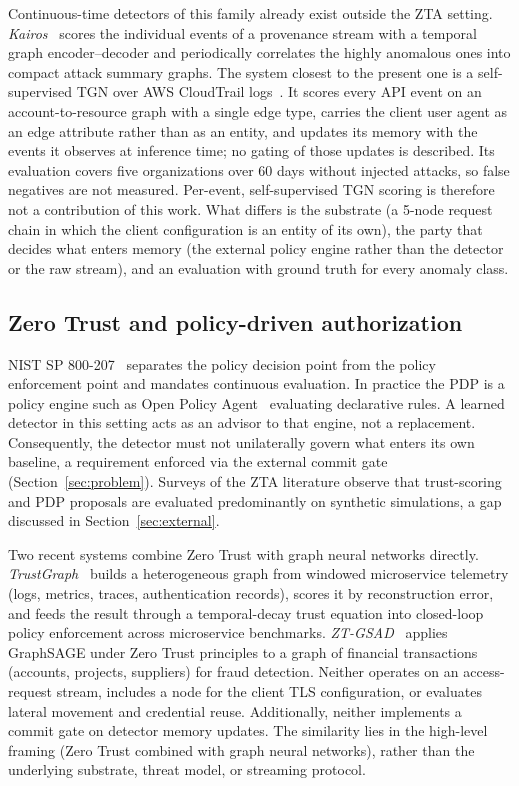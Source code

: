 Continuous-time detectors of this family already exist outside the ZTA setting.
\textit{Kairos}~\cite{kairos} scores the individual events of a provenance stream with a
temporal graph encoder--decoder and periodically correlates the highly anomalous ones into
compact attack summary graphs. The system
closest to the present one is a self-supervised TGN over AWS CloudTrail logs~\cite{cloudtrailtgn}.
It scores every API event on an account-to-resource graph with a single edge type, carries the
client user agent as an edge attribute rather than as an entity, and updates its memory with
the events it observes at inference time; no gating of those updates is described. Its
evaluation covers five organizations over 60 days without injected attacks, so false negatives
are not measured. Per-event, self-supervised TGN scoring is therefore not a contribution of this
work. What differs is the substrate (a 5-node request chain in which the client configuration
is an entity of its own), the party that decides what enters memory (the external policy
engine rather than the detector or the raw stream), and an evaluation with ground truth for
every anomaly class.

\subsection{Zero Trust and policy-driven authorization}

NIST SP 800-207~\cite{nist800207} separates the policy decision point from the policy
enforcement point and mandates continuous evaluation. In practice the PDP is a policy
engine such as Open Policy Agent~\cite{opa} evaluating declarative rules. A learned
detector in this setting acts as an advisor to that engine, not a replacement.
Consequently, the detector must not unilaterally govern what enters its own baseline,
a requirement enforced via the external commit gate (Section~\ref{sec:problem}).
Surveys of the ZTA literature observe that trust-scoring and PDP proposals
are evaluated predominantly on synthetic simulations, a gap discussed in Section~\ref{sec:external}.

Two recent systems combine Zero Trust with graph neural networks directly.
\textit{TrustGraph}~\cite{trustgraph} builds a heterogeneous graph from windowed
microservice telemetry (logs, metrics, traces, authentication records), scores it
by reconstruction error, and feeds the result through a temporal-decay trust equation
into closed-loop policy enforcement across microservice benchmarks. \textit{ZT-GSAD}~\cite{ztgsad}
applies GraphSAGE under Zero Trust principles to a graph of financial transactions
(accounts, projects, suppliers) for fraud detection. Neither operates on an access-request
stream, includes a node for the client TLS configuration, or evaluates lateral movement
and credential reuse. Additionally, neither implements a commit gate on detector memory updates.
The similarity lies in the high-level framing (Zero Trust combined with graph neural networks),
rather than the underlying substrate, threat model, or streaming protocol.

